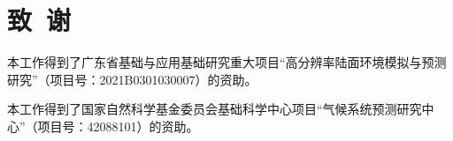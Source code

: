 
\section*{致~谢}

本工作得到了广东省基础与应用基础研究重大项目“高分辨率陆面环境模拟与预测研究”（项目号：2021B0301030007）的资助。

本工作得到了国家自然科学基金委员会基础科学中心项目“气候系统预测研究中心”（项目号：42088101）的资助。